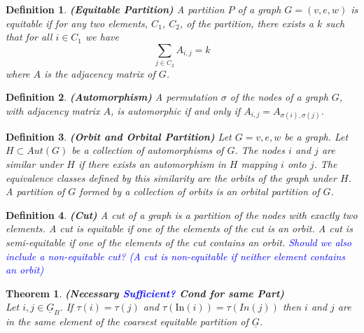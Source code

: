 \documentclass[10pt]{elsarticle}
\newcommand{\In}{\text{In}}
\newtheorem{theorem}{Theorem}
\newtheorem{definition}{Definition}
\theoremstyle{remark}
\begin{document}
\begin{definition}\label{def:ep}{\textbf{(Equitable Partition)}}
A partition $P$ of a graph $G = (v,e,w)$ is equitable if for any two elements, $C_1$, $C_2$, of the partition, there exists a $k$ such that for all $i\in C_1$ we have
\[
\sum_{j \in C_2} A_{i,j} = k
\]
where $A$ is the adjacency matrix of $G$.
\end{definition}

\begin{definition}\label{def:auto}\textbf{(Automorphism)}
A permutation $\sigma$ of the nodes of a graph $G$, with adjacency matrix $A$, is automorphic if and only if $A_{i,j} = A_{\sigma(i),\sigma(j)}$.
\end{definition}

\begin{definition}\label{def:orbit}{\textbf{\emph{(Orbit and Orbital Partition)}}}
Let $G= {v,e,w}$ be a graph. Let $H \subset Aut(G)$ be a collection of automorphisms of $G$.
The nodes $i$ and $j$ are \emph{similar} under $H$ if there exists an automorphism in $H$ mapping $i$ onto $j$.
The equivalence classes defined by this similarity are the \emph{orbits} of the graph under $H$.
A partition of $G$ formed by a collection of orbits is an \emph{orbital partition} of $G$.
\end{definition}

\begin{definition}\label{def:cut}{\textbf{(Cut)}}
A \emph{cut} of a graph is a partition of the nodes with exactly two elements.
A cut is \emph{equitable} if one of the elements of the cut is an orbit.
A cut is \emph{semi-equitable} if one of the elements of the cut contains an orbit.
\textcolor{blue}{Should we also include a non-equitable cut? (A cut is \emph{non-equitable} if neither element contains an orbit)}
\end{definition}


\begin{theorem}{\textbf{(Necessary \textcolor{blue}{Sufficient?} Cond for same Part) \\}}
Let $i,j \in \underline{G}_B$. If $\tau(i) = \tau(j)$ and $\tau(\In(i)) = \tau(In(j))$ then $i$ and $j$ are in the same element of the
coarsest equitable partition of $\underline{G}$.
\end{theorem}
\end{document}
